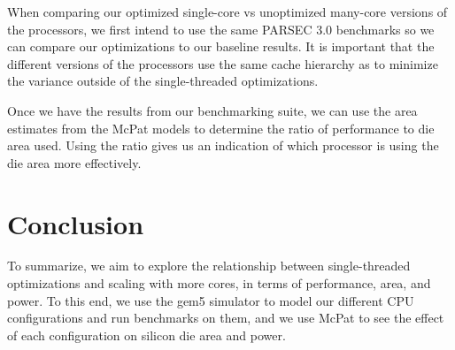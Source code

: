 \documentclass[conference,9pt]{IEEEtran}
\begin{document}
When comparing our optimized single-core vs unoptimized many-core versions of the processors, we first intend to use the same PARSEC 3.0 benchmarks so we can compare our optimizations to our baseline results. It is important that the different versions of the processors use the same cache hierarchy as to minimize the variance outside of the single-threaded optimizations.

Once we have the results from our benchmarking suite, we can use the area estimates from the McPat models to determine the ratio of performance to die area used. Using the ratio gives us an indication of which processor is using the die area more effectively.

\section{Conclusion}
To summarize, we aim to explore the relationship between single-threaded optimizations and scaling with more cores, in terms of performance, area, and power. To this end, we use the gem5 simulator to model our different CPU configurations and run benchmarks on them, and we use McPat to see the effect of each configuration on silicon die area and power.


\end{document}
